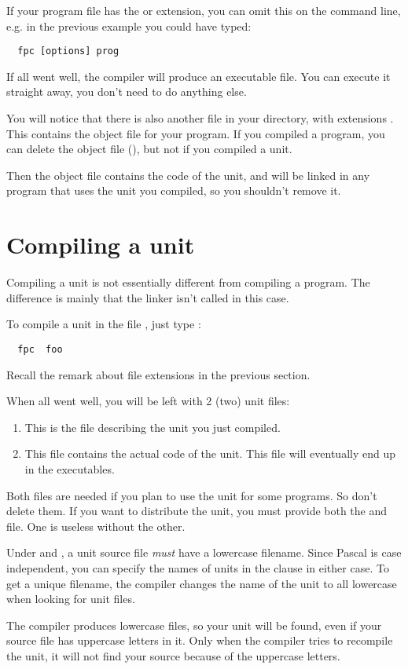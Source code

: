 If your program file has the  or  extension,
you can omit this on the command line, e.g. in the previous example you
could have typed:
\begin{verbatim}
  fpc [options] prog
\end{verbatim}

If all went well, the compiler will produce an executable file. You can execute 
it straight away, you don't need to do anything else. 

You will notice that there is also another file in your directory, with
extensions . This contains the object file for your program.
If you compiled a program, you can delete the object file (),
but not if you compiled a unit.

Then the object file contains the code of the unit, and will be
linked in any program that uses the unit you compiled, so you shouldn't
remove it.


\section{Compiling a unit}

Compiling a unit is not essentially different from compiling a program.
The difference is mainly that the linker isn't called in this case.

To compile a unit in the file , just type :
\begin{verbatim}
  fpc  foo
\end{verbatim}
Recall the remark about file extensions in the previous section.

When all went well, you will be left with 2 (two) unit files:
\begin{enumerate}
\item {} This is the file describing the unit you just
compiled.
\item {} This file contains the actual code of the unit.
This file will eventually end up in the executables.
\end{enumerate}
Both files are needed if you plan to use the unit for some programs.
So don't delete them. If you want to distribute the unit, you must
provide both the  and  file. One is useless without the
other.

\begin{remark}
Under \linux and \unix, a unit source file {\em must} have a lowercase filename.
Since Pascal is case independent, you can specify the names of units in the
 clause in either case. To get a unique filename, the \fpc compiler
changes the name of the unit to all lowercase when looking for unit files.
\end{remark}
The compiler produces lowercase files, so your unit will be found, even if
your source file has uppercase letters in it. Only when the compiler tries to
recompile the unit, it will not find your source because of the uppercase
letters.


